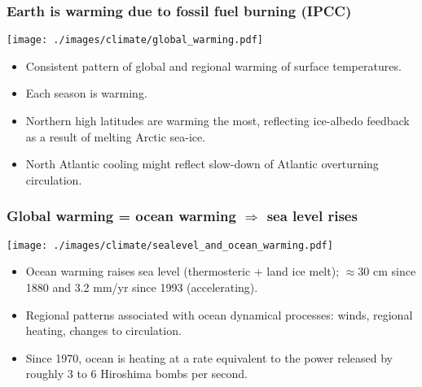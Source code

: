 \documentclass[10pt]{beamer}
\begin{document}
\begin{frame}
  \frametitle{Earth is warming due to fossil fuel burning (IPCC)}

\begin{center}
\vspace{-.25cm}
{\texttt{[image: ./images/climate/global\_warming.pdf]}}
\vspace{-.75cm}
\end{center}

\begin{exampleblock}{}
\begin{itemize}
\item Consistent pattern of global and regional warming of surface temperatures. 
\item Each season is warming.
\item Northern high latitudes are warming the most, reflecting
  ice-albedo feedback as a result of melting Arctic sea-ice.
\item North Atlantic cooling might reflect slow-down of Atlantic
  overturning circulation.
\end{itemize}
\end{exampleblock}{}

\end{frame}


\begin{frame}
  \frametitle{Global warming = ocean warming $\Rightarrow$ sea level rises}

\begin{center}
\vspace{-.25cm}
{\texttt{[image: ./images/climate/sealevel\_and\_ocean\_warming.pdf]}}
\vspace{-0.5cm}
\end{center}

\begin{exampleblock}{}
\begin{itemize}
\item Ocean warming raises sea level (thermosteric + land ice melt);
  $\approx 30$ cm since 1880 and 3.2 mm/yr since 1993 (accelerating).
\item Regional patterns associated with ocean dynamical processes:
  winds, regional heating, changes to circulation.
\item Since 1970, ocean is heating at a rate equivalent to the power
  released by roughly 3 to 6 Hiroshima bombs per second.
\end{itemize}
\end{exampleblock}{}

\end{frame}
\end{document}
